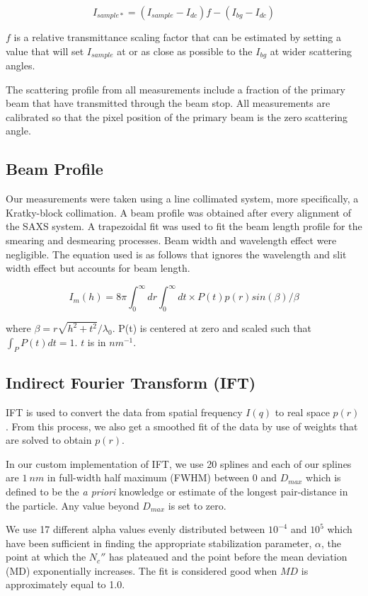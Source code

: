 \documentclass[10pt]{article}%
\begin{document}
\begin{equation}
I_{sample*}=(I_{sample}-I_{dc})f - (I_{bg}-I_{dc})
\end{equation}

$f$ is a relative transmittance scaling factor that can be estimated by setting a value that will set $I_{sample}$ at or as close as possible to the $I_{bg}$ at wider scattering angles.

The scattering profile from all measurements include a fraction of the primary beam that have transmitted through the beam stop. All measurements are calibrated so that the pixel position of the primary beam is the zero scattering angle. 

\subsection{Beam Profile}
Our measurements were taken using a line collimated system, more specifically, a Kratky-block collimation. A beam profile was obtained after every alignment of the SAXS system. A trapezoidal fit was used to fit the beam length profile for the smearing and desmearing processes. Beam width and wavelength effect were negligible. The equation used is as follows that ignores the wavelength and slit width effect but accounts for beam length. 

\begin{equation}
I_m(h)=8\pi\int_0^{\infty}dr\int_0^{\infty}dt \times P(t)p(r)sin(\beta)/\beta 
\end{equation}

where $\beta=r\sqrt{h^2+t^2}/\lambda_0$. P(t) is centered at zero and scaled such that $\int_P P(t) dt=1$. $t$ is in $nm^{-1}$.

\subsection{Indirect Fourier Transform (IFT)}
IFT is used to convert the data from spatial frequency $I(q)$ to real space $p(r)$. From this process, we also get a smoothed fit of the data by use of weights that are solved to obtain $p(r)$.

In our custom implementation of IFT, we use 20 splines and each of our splines are $1~nm$ in full-width half maximum (FWHM) between 0 and $D_{max}$ which is defined to be the \textit{a priori} knowledge or estimate of the longest pair-distance in the particle. Any value beyond $D_{max}$ is set to zero. 

We use 17 different alpha values evenly distributed between $10^{-4}$ and $10^5$ which have been sufficient in finding the appropriate stabilization parameter, $\alpha$, the point at which the $N_c''$ has plateaued and the point before the mean deviation (MD) exponentially increases. The fit is considered good when $MD$ is approximately equal to 1.0. 
\end{document}
